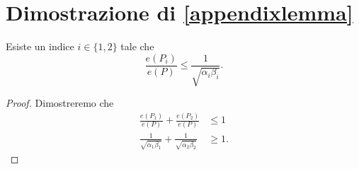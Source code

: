 \appendix
\chapter{Dimostrazione di \ref{appendixlemma}}

\begin{theorem}
    Esiste un indice \(i\in\{1,2\}\) tale che \[\frac{e(P_i)}{e(P)}\le\frac{1}{\sqrt{\alpha_i\beta_i}}.\]
\end{theorem}
\begin{proof}
    Dimostreremo che
    \begin{align}
        \frac{e(P_1)}{e(P)}+\frac{e(P_2)}{e(P)}&\le 1 \nonumber \\
        \frac{1}{\sqrt{\alpha_1\beta_1}}+\frac{1}{\sqrt{\alpha_2\beta_2}}&\ge 1. \nonumber
    \end{align}
\end{proof}
